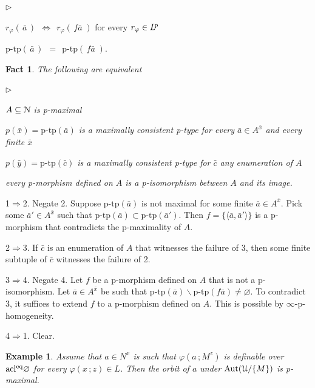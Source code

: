 \documentclass{amsproc}
\makeatletter
\def\U{\EuScript U}
\def\N{\EuScript N}
\def\phi{\varphi}
\newcommand{\mylabel}[1]{{#1}\hfill}
\renewenvironment{itemize}
  {\begin{list}{$\triangleright$}{%
  \setlength{\parskip}{0mm}
  \setlength{\topsep}{.1\baselineskip}
  \setlength{\rightmargin}{0mm}
  \setlength{\listparindent}{0mm}
  \setlength{\itemindent}{0mm}
  \setlength{\labelwidth}{3ex}
  \setlength{\itemsep}{.1\baselineskip}
  \setlength{\parsep}{.1\baselineskip}
  \setlength{\partopsep}{0mm}
  \setlength{\labelsep}{1ex}
  \setlength{\leftmargin}{\labelwidth+\labelsep}
  \let\makelabel\mylabel}}{%
\end{list}}
\newcounter{thm}
\theoremstyle{mio}
\newtheorem{fact}[thm]{Fact}\tcolorboxenvironment{fact}{mythm}
\newtheorem{example}[thm]{Example}\tcolorboxenvironment{example}{mythm}
\providecommand{\proofNameStyle}{\bfseries}
\renewenvironment{proof}[1][\proofname]{\par
  \pushQED{\qed}%
  \normalfont%
  \trivlist
  \item[\hskip\labelsep
        \proofNameStyle
    #1\@addpunct{.}]\ignorespaces
}{%
  \popQED\endtrivlist\@endpefalse
}
\makeatother
\begin{document}
\begin{itemize}
  \item[a.] $r_{\phi}(\,\bar a\,)\ \ \Leftrightarrow\ \ r_{\phi}(\,f\!\bar a\;)$ \hfill
  for every $r_{\phi}\in L^{\rm\! p}$

  \item[b.] $\textrm{p-tp}(\,\bar a\,)\ \ =\ \ \textrm{p-tp}(\,f\!\bar a\;)$.
\end{itemize}


\begin{fact}\label{fact_pmaximal}
  The following are equivalent
  \begin{itemize}
    \item[1.] $A\subseteq\N$ is p-maximal
    \item[2.] $p(\bar x)=\textrm{p-tp}(\bar a)$ is a maximally consistent p-type for every $\bar a\in A^{\bar x}$ and every finite $\bar x$
    \item[3.] $p(\bar y)=\textrm{p-tp}(\bar c)$ is a maximally consistent p-type for $\bar c$ any enumeration of $A$
    \item[4.] every p-morphism defined on $A$ is a p-isomorphism between $A$ and its image.
  \end{itemize}
\end{fact}

\begin{proof}
  1$\Rightarrow$2. Negate 2. Suppose $\textrm{p-tp}(\bar a)$ is not maximal for some finite $\bar a\in A^{\bar x}$.
  Pick some $\bar a'\in A^{\bar x}$ such that $\textrm{p-tp}(\bar a)\subset \textrm{p-tp}(\bar a')$.
  Then $f=\{\langle \bar a,\bar a'\rangle\}$ is a p-morphism that contradicts the p-maximality of $A$.
  
  2$\Rightarrow$3. If $\bar c$ is an enumeration of $A$ that witnesses the failure of 3, then some finite subtuple of $\bar c$ witnesses the failure of 2.

  3$\Rightarrow$4. Negate 4. Let $f$ be a p-morphism defined on $A$ that is not a p-isomorphism.
  Let $\bar a\in A^{\bar x}$ be such that  $\textrm{p-tp}(\bar a)\smallsetminus \textrm{p-tp}(f\bar a)\neq\varnothing$.
  To contradict 3, it suffices to extend $f$ to a p-morphism defined on $A$.
  This is possible by $\infty$-p-homogeneity.

  4$\Rightarrow$1. Clear.
\end{proof}

\begin{example}
  Assume that $a\in N^x$ is such that $\phi(a\,;M^z)$ is definable over ${\rm acl^{eq}}\varnothing$ for every $\phi(x\,;z)\in L$.
  Then the orbit of $a$ under ${\rm Aut}(\U/\{M\})$ is p-maximal.
\end{example}
\end{document}
